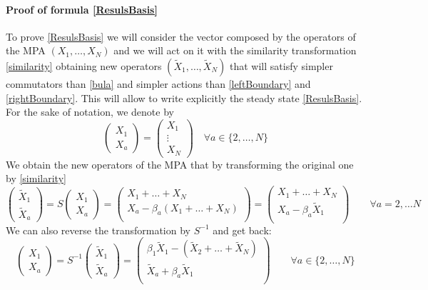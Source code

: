 \documentclass[11pt]{article}
\numberwithin{equation}{section}
\numberwithin{equation}{subsection}
\newcommand{\Xt}{\tilde{X}}
\begin{document}
\paragraph{Proof of formula \eqref{ResulsBasis}} 
To prove \eqref{ResulsBasis} we will consider the vector composed by the operators of the MPA $(X_{1},\ldots,X_{N})$ and we will act on it with the similarity transformation \eqref{similarity} obtaining new operators $(\Xt_{1},\ldots,\Xt_{N})$ that will satisfy simpler commutators than \eqref{bula} and simpler actions than \eqref{leftBoundary} and \eqref{rightBoundary}. This will allow to write explicitly the steady state \eqref{ResulsBasis}.
For the sake of notation, we denote by 
\begin{equation}
    \begin{pmatrix}
		X_{1}\\ 
		X_{a}
	\end{pmatrix}=\begin{pmatrix}
	    X_{1}\\
     \vdots\\
     X_{N}
	\end{pmatrix}\quad \forall a\in \{2,\ldots,N\}
\end{equation}
We obtain the new operators of the MPA that by transforming the original one by \eqref{similarity} 
\begin{equation}\label{Xtildes2b}
	\begin{pmatrix}
		\Xt_{1}\\ 
		\Xt_{a}
	\end{pmatrix} =S\begin{pmatrix}
		X_{1}\\X_{a}
	\end{pmatrix}=\begin{pmatrix} 
		X_{1}+\ldots +X_{N}\\
		X_{a}-\beta_{a}(X_{1}+\ldots+X_{N})\\ 
	\end{pmatrix}=\begin{pmatrix} 
		X_{1}+\ldots +X_{N}\\
		X_{a}-\beta_{a}\Xt_{1}\\ 
	\end{pmatrix}\qquad \forall a=2,\ldots N
\end{equation}
We can also reverse the transformation by $S^{-1}$ and get back: 
\begin{equation}\label{Xes}
	\begin{pmatrix}
		X_{1}\\
		X_{a} 
	\end{pmatrix} =S^{-1}\begin{pmatrix}
		\widetilde{X}_{1}\\
		\widetilde{X}_{a}
	\end{pmatrix}=\begin{pmatrix}
		\beta_1\Xt_{1}-(\Xt_{2}+\ldots+\Xt_{N})\\
		\Xt_{a}+\beta_{a}\Xt_{1}\\ 
	\end{pmatrix}\qquad\forall a\in \{2,\ldots,N\}
\end{equation}
\end{document}
